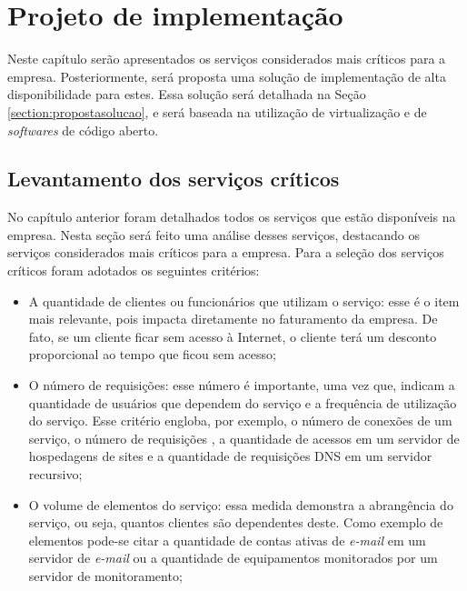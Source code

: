 \chapter{Projeto de implementação}
\label{cap:projetoimplementacao}

Neste capítulo serão apresentados os serviços considerados mais críticos para a empresa. Posteriormente, será proposta uma solução de implementação 
de alta disponibilidade para estes. Essa solução será detalhada na Seção \ref{section:propostasolucao}, e será baseada na utilização de 
virtualização e de \textit{softwares} de código aberto. 

\section{Levantamento dos serviços críticos}
\label{section:servcrit}

No capítulo anterior foram detalhados todos os serviços que estão disponíveis na empresa. Nesta seção será feito uma análise desses
serviços, destacando os serviços considerados mais críticos para a empresa. Para a seleção dos serviços críticos foram adotados os seguintes
critérios:
\begin{itemize}
 \item A quantidade de clientes ou funcionários que utilizam o serviço: esse é o item mais relevante, pois impacta diretamente no faturamento
 da empresa. De fato, se um cliente ficar sem acesso à Internet, o cliente terá um desconto proporcional ao tempo que ficou sem 
 acesso; 
 \item O número de requisições: esse número é importante, uma vez que, indicam a quantidade de usuários que dependem do serviço e a frequência
 de utilização do serviço. Esse critério engloba, por exemplo, o número de conexões  \cite{tanenbaum2011} de um serviço, o número de 
 requisições  \cite{tanenbaum2011}, a quantidade de acessos em um servidor de hospedagens de sites e a quantidade de requisições \ac{DNS} 
 em um servidor recursivo;
 \item O volume de elementos do serviço: essa medida demonstra a abrangência do serviço, ou seja, quantos clientes são dependentes deste. 
 Como exemplo de elementos pode-se citar a quantidade de contas ativas de \textit{e-mail} em um servidor de \textit{e-mail} ou a quantidade de 
 equipamentos monitorados por um servidor de monitoramento;
\end{itemize}

